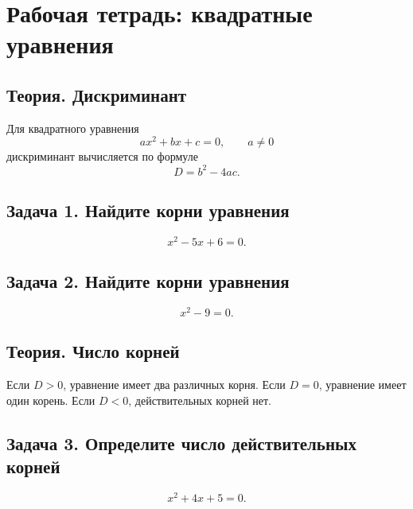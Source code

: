 \documentclass[12pt,a4paper]{article}
\begin{document}
\section*{Рабочая тетрадь: квадратные уравнения}
\subsection*{Теория. Дискриминант}
Для квадратного уравнения \[
ax^2 + bx + c = 0, \qquad a \neq 0
\]
дискриминант вычисляется по формуле
\[
D = b^2 - 4ac.
\]
\vspace{8mm}
\subsection*{Задача 1. Найдите корни уравнения}
\[
x^2 - 5x + 6 = 0.
\]
\vspace{8mm}
\subsection*{Задача 2. Найдите корни уравнения}
\[
x^2 - 9 = 0.
\]
\vspace{8mm}
\subsection*{Теория. Число корней}
Если $D > 0$, уравнение имеет два различных корня. Если $D = 0$, уравнение имеет один корень. Если $D < 0$, действительных корней нет.
\vspace{8mm}
\subsection*{Задача 3. Определите число действительных корней}
\[
x^2 + 4x + 5 = 0.
\]
\vspace{8mm}
\end{document}

